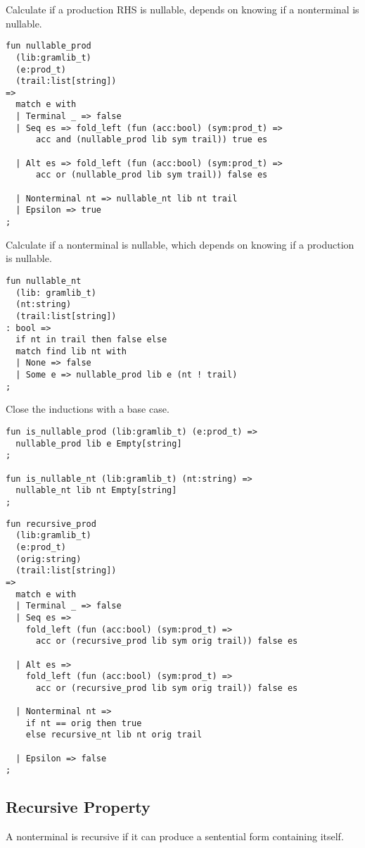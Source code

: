\documentclass[oneside]{book}
\begin{document}
Calculate if a production RHS is nullable, depends on
knowing if a nonterminal is nullable.

\begin{verbatim}
fun nullable_prod 
  (lib:gramlib_t) 
  (e:prod_t) 
  (trail:list[string]) 
=>
  match e with
  | Terminal _ => false
  | Seq es => fold_left (fun (acc:bool) (sym:prod_t) => 
      acc and (nullable_prod lib sym trail)) true es

  | Alt es => fold_left (fun (acc:bool) (sym:prod_t) => 
      acc or (nullable_prod lib sym trail)) false es

  | Nonterminal nt => nullable_nt lib nt trail
  | Epsilon => true
;
\end{verbatim}

Calculate if a nonterminal is nullable, which depends on
knowing if a production is nullable.

\begin{verbatim}
fun nullable_nt 
  (lib: gramlib_t) 
  (nt:string) 
  (trail:list[string]) 
: bool =>
  if nt in trail then false else
  match find lib nt with
  | None => false
  | Some e => nullable_prod lib e (nt ! trail)
;
\end{verbatim}

Close the inductions with a base case.

\begin{verbatim}
fun is_nullable_prod (lib:gramlib_t) (e:prod_t) => 
  nullable_prod lib e Empty[string]
;

fun is_nullable_nt (lib:gramlib_t) (nt:string) => 
  nullable_nt lib nt Empty[string]
;
\end{verbatim}

\begin{verbatim}
fun recursive_prod 
  (lib:gramlib_t) 
  (e:prod_t) 
  (orig:string) 
  (trail:list[string]) 
=>
  match e with
  | Terminal _ => false
  | Seq es => 
    fold_left (fun (acc:bool) (sym:prod_t) => 
      acc or (recursive_prod lib sym orig trail)) false es

  | Alt es => 
    fold_left (fun (acc:bool) (sym:prod_t) => 
      acc or (recursive_prod lib sym orig trail)) false es

  | Nonterminal nt => 
    if nt == orig then true 
    else recursive_nt lib nt orig trail

  | Epsilon => false
;
\end{verbatim}

\subsection{Recursive Property}
A nonterminal is recursive if it can produce a sentential
form containing itself.
\end{document}
